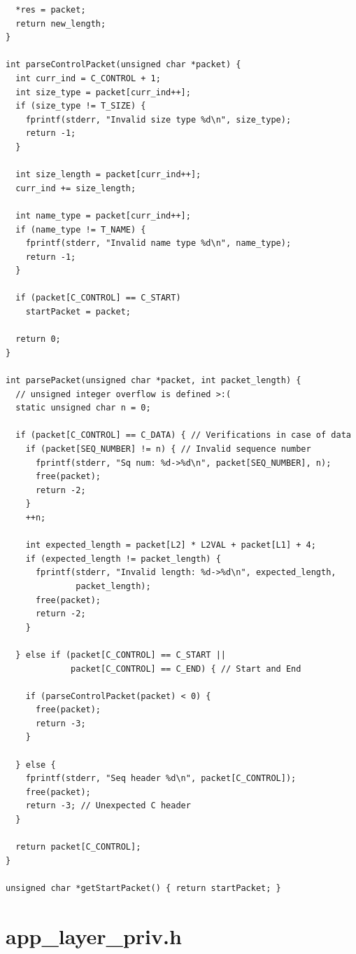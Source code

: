 \documentclass[11pt]{report}
\begin{document}
\begin{lstlisting}
  *res = packet;
  return new_length;
}

int parseControlPacket(unsigned char *packet) {
  int curr_ind = C_CONTROL + 1;
  int size_type = packet[curr_ind++];
  if (size_type != T_SIZE) {
    fprintf(stderr, "Invalid size type %d\n", size_type);
    return -1;
  }

  int size_length = packet[curr_ind++];
  curr_ind += size_length;

  int name_type = packet[curr_ind++];
  if (name_type != T_NAME) {
    fprintf(stderr, "Invalid name type %d\n", name_type);
    return -1;
  }

  if (packet[C_CONTROL] == C_START)
    startPacket = packet;

  return 0;
}

int parsePacket(unsigned char *packet, int packet_length) {
  // unsigned integer overflow is defined >:(
  static unsigned char n = 0;

  if (packet[C_CONTROL] == C_DATA) { // Verifications in case of data
    if (packet[SEQ_NUMBER] != n) { // Invalid sequence number
      fprintf(stderr, "Sq num: %d->%d\n", packet[SEQ_NUMBER], n);
      free(packet);
      return -2;
    }
    ++n;

    int expected_length = packet[L2] * L2VAL + packet[L1] + 4;
    if (expected_length != packet_length) {
      fprintf(stderr, "Invalid length: %d->%d\n", expected_length,
              packet_length);
      free(packet);
      return -2;
    }

  } else if (packet[C_CONTROL] == C_START ||
             packet[C_CONTROL] == C_END) { // Start and End

    if (parseControlPacket(packet) < 0) {
      free(packet);
      return -3;
    }

  } else {
    fprintf(stderr, "Seq header %d\n", packet[C_CONTROL]);
    free(packet);
    return -3; // Unexpected C header
  }

  return packet[C_CONTROL];
}

unsigned char *getStartPacket() { return startPacket; }
\end{lstlisting}

\section{app\_layer\_priv.h}
\end{document}
